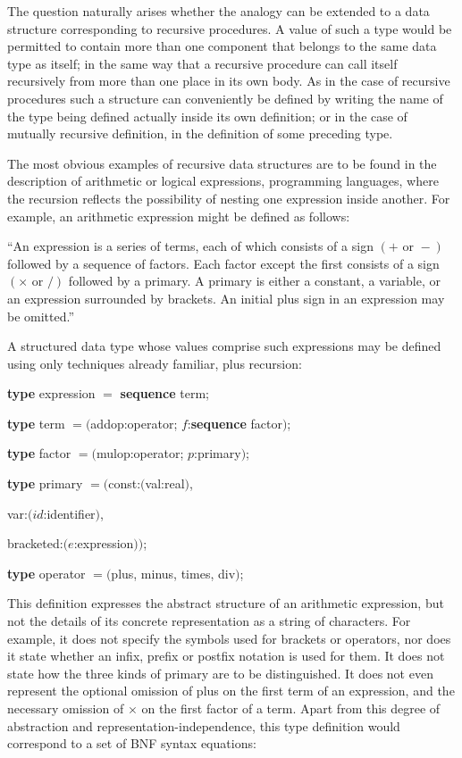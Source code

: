 The question naturally arises whether the analogy can be extended to a data structure corresponding to recursive procedures. A value of such a type would be permitted to contain more than one component that belongs to the same data type as itself; in the same way that a recursive procedure can call itself recursively from more than one place in its own body. As in the case of recursive procedures such a structure can conveniently be defined by writing the name of the type being defined actually inside its own definition; or in the case of mutually recursive definition, in the definition of some preceding type.

The most obvious examples of recursive data structures are to be found in the description of arithmetic or logical expressions, programming languages, where the recursion reflects the possibility of nesting one expression inside another. For example, an arithmetic expression might be defined as follows:

``An expression is a series of terms, each of which consists of a sign $(+ \text{ or } -)$ followed by a sequence of factors. Each factor except the first consists of a sign $(\times \text{ or } /)$ followed by a primary. A primary is either a constant, a variable, or an expression surrounded by brackets. An initial plus sign in an expression may be omitted.''

A structured data type whose values comprise such expressions may be defined using only techniques already familiar, plus recursion:

\quad \textbf{type} expression $=$ \textbf{sequence} term;

\quad \textbf{type} term $= ($addop:operator; $f$:\textbf{sequence} factor$)$;

\quad \textbf{type} factor $= ($mulop:operator; $p$:primary$)$;

\quad \textbf{type} primary $= ($const:$($val:real$)$,

\tabto*{9.3em}var:$(id$:identifier$)$,

\tabto*{9.3em}bracketed:$(e$:expression$))$;

\quad \textbf{type} operator $= ($plus, minus, times, div$)$;

This definition expresses the abstract structure of an arithmetic expression, but not the details of its concrete representation as a string of characters. For example, it does not specify the symbols used for brackets or operators, nor does it state whether an infix, prefix or postfix notation is used for them. It does not state how the three kinds of primary are to be distinguished. It does not even represent the optional omission of plus on the first term of an expression, and the necessary omission of $\times$ on the first factor of a term. Apart from this degree of abstraction and representation-independence, this type definition would correspond to a set of BNF syntax equations:


